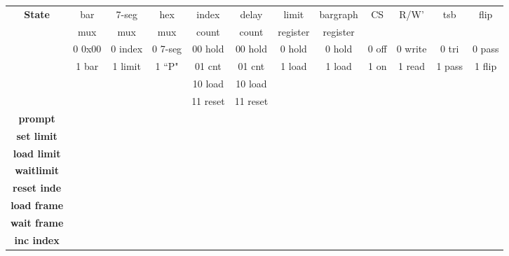 \begin{description}
\begin{landscape}
            \begin{table}
                {\small
                    \begin{tabular}{c||c|c|c|c|c|c|c|c|c|c|c}
                        \textbf{ State }     & bar & 7-seg & hex & index & delay & limit    & bargraph & CS &
                        R/W' & tsb & flip \\
                        & mux & mux   & mux & count & count & register & register &       &       & &
                        \\  \hline \hline
                        & 0 0x00 & 0 index & 0 7-seg & 00 hold & 00 hold & 0 hold & 0 hold & 0 off & 0 write
                        & 0 tri & 0 pass \\
                        & 1 bar    & 1 limit & 1 ``P"& 01 cnt & 01 cnt & 1 load &    1 load & 1 on    &  1
                        read & 1 pass & 1 flip \\
                        &     &     &     & 10 load & 10 load & & & & & \\
                        &     &     &        & 11 reset    & 11 reset & & & & \\ \hline \hline
                        \textbf{ prompt }      &       &      &      &       &       &      &      &      &
                        &      &   \\ \hline
                        \textbf{ set limit }  &       &      &      &       &       &      &      &      &
                        &      &   \\ \hline
                        \textbf{ load limit } &      &      &      &       &       &      &      &      &   &
                        &   \\ \hline
                        \textbf{ waitlimit } &      &      &      &       &       &      &      &      &   &
                        &   \\ \hline
                        \textbf{ reset inde  } &      &      &       &       &       &      &      &      &
                        &      &   \\ \hline
                        \textbf{ load frame } &      &      &      &       &       &      &      &      &   &
                        &   \\ \hline
                        \textbf{ wait frame } &      &      &      &       &       &      &      &      &   &
                        &   \\ \hline
                        \textbf{ inc index } &      &      &      &       &       &      &      &      &   &

\end{tabular}}
\end{table}
\end{landscape}
\end{description}

